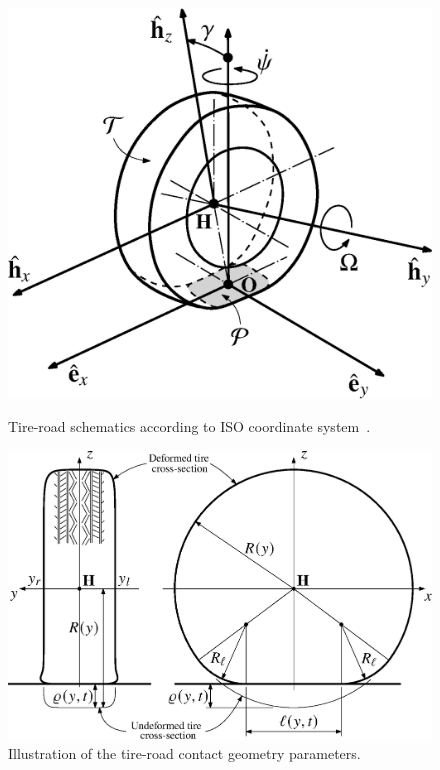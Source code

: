 \begin{figure}
  \centering
  \begin{minipage}[t]{0.425\linewidth}
    \centering
    \includegraphics[width=0.9\linewidth]{./figures/chapter_4/tire_iso}
    \caption{Tire-road schematics according to ISO coordinate system~\cite{iso88552011}.}
    \label{chap4:fig:tire_iso}
  \end{minipage}
  \hfill
  \begin{minipage}[t]{0.525\linewidth}
    \centering
    \includegraphics[width=1.0\linewidth]{./figures/chapter_4/belt_section}
    \caption{Illustration of the tire-road contact geometry parameters.}
    \label{chap4:fig:belt_section}
  \end{minipage}
\end{figure}

